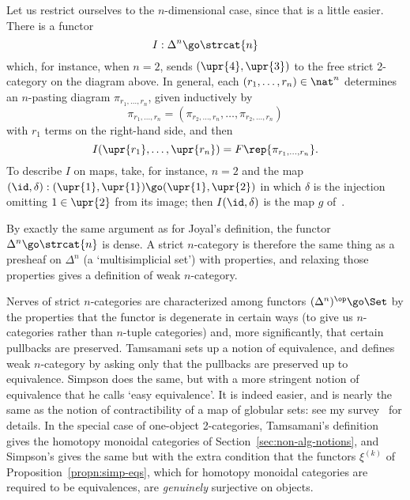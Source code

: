 Let us restrict ourselves to the $n$-dimensional case, since that is a
little easier.  There is a functor
\[
I: \Delta^n \go \strcat{n}
\]%
%
%
%
which, for instance, when $n=2$, sends $(\upr{4}, \upr{3})$ to the free
strict 2-category on the diagram above.  In general, each $(r_1, \ldots,
r_n) \in \nat^n$ determines an $n$-pasting diagram $\pi_{r_1, \ldots,
r_n}$, given inductively by
\[
\pi_{r_1, \ldots, r_n}
=
\left(\pi_{r_2, \ldots, r_n}, \ldots, \pi_{r_2, \ldots, r_n}\right)
\]
with $r_1$ terms on the right-hand side, and then
\[
I(\upr{r_1}, \ldots, \upr{r_n})
=
F\rep{\pi_{r_1, \ldots, r_n}}.
\]
To describe $I$ on maps, take, for instance, $n=2$ and the map $(\id,
\delta): (\upr{1}, \upr{1}) \go (\upr{1}, \upr{2})$ in which $\delta$ is
the injection omitting $1 \in \upr{2}$ from its image; then $I(\id,
\delta)$ is the map $g$ of~.

By exactly the same argument as for Joyal's definition, the functor
$\Delta^n \go \strcat{n}$ is dense.  A strict $n$-category is therefore the
same thing as a presheaf on $\Delta^n$ (a `multisimplicial%
%
%
%
%
%
set') with
properties, and relaxing those properties gives a definition of weak
$n$-category.

Nerves of strict $n$-categories are characterized among functors
$(\Delta^n)^\op \go \Set$ by the properties that the functor is degenerate
in certain ways (to give us $n$-categories rather%
%
%
than $n$-tuple
categories) and, more significantly, that certain pullbacks are preserved.
Tamsamani sets up a notion of equivalence,%
%
%
and defines weak $n$-category by
asking only that the pullbacks are preserved up to equivalence.  Simpson
does the same, but with a more stringent notion of equivalence that he
calls `easy%
%
%
equivalence'.  It is indeed easier, and is nearly the same as
the notion of contractibility%
%
%
of a map of globular sets: see my
survey~\cite{SDN} for details.  In the special case of one-object
2-categories, Tamsamani's definition gives the homotopy monoidal categories
of Section~\ref{sec:non-alg-notions}, and Simpson's gives the same but with
the extra condition that the functors $\xi^{(k)}$ of
Proposition~\ref{propn:simp-eqs}, which for homotopy%
%
%
monoidal categories
are required to be equivalences, are \emph{genuinely} surjective on
objects.%
%
%
%
%
%
%
%
%
%








